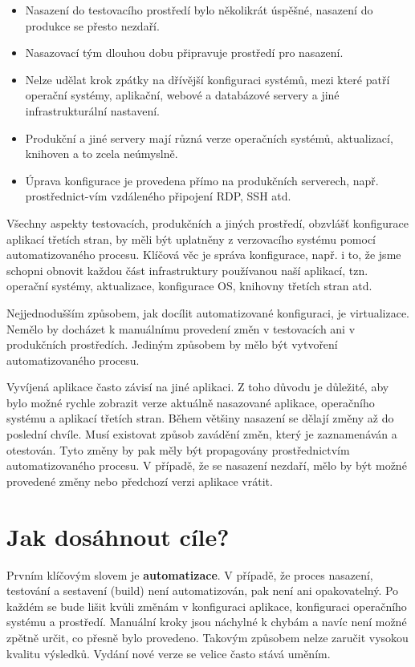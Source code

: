 \begin{itemize}
  \item Nasazení do testovacího prostředí bylo několikrát úspěšné, nasazení do produkce se přesto nezdaří.
  \item Nasazovací tým dlouhou dobu připravuje prostředí pro nasazení.
  \item Nelze udělat krok zpátky na dřívější konfiguraci systémů, mezi které patří operační systémy, aplikační, webové a databázové servery a jiné infrastrukturální nastavení.
  \item Produkční a jiné servery mají různá verze operačních systémů, aktualizací, knihoven a to zcela neúmyslně.
  \item Úprava konfigurace je provedena přímo na produkčních serverech, např. prostřednict-vím vzdáleného připojení RDP, SSH atd.
\end{itemize}

Všechny aspekty testovacích, produkčních a jiných prostředí, obzvlášť konfigurace aplikací třetích stran, by měli být uplatněny z verzovacího systému pomocí automatizovaného procesu. Klíčová věc je správa konfigurace, např. i to, že jsme schopni obnovit každou část infrastruktury používanou naší aplikací, tzn. operační systémy, aktualizace, konfigurace OS, knihovny třetích stran atd. 

Nejjednodušším způsobem, jak docílit automatizované konfiguraci, je virtualizace. Nemělo by docházet k manuálnímu provedení změn v testovacích ani v produkčních prostředích. Jediným způsobem by mělo být vytvoření automatizovaného procesu.

Vyvíjená aplikace často závisí na jiné aplikaci. Z toho důvodu je důležité, aby bylo možné rychle zobrazit verze aktuálně nasazované aplikace, operačního systému a aplikací třetích stran. Během většiny nasazení se dělají změny až do poslední chvíle. Musí existovat způsob zavádění změn, který je zaznamenáván a otestován. Tyto změny by pak měly být propagovány prostřednictvím automatizovaného procesu. V případě, že se nasazení nezdaří, mělo by být možné provedené změny nebo předchozí verzi aplikace vrátit.

\section{Jak dosáhnout cíle?}
Prvním klíčovým slovem je \textbf{automatizace}. V případě, že proces nasazení, testování a sestavení (build) není automatizován, pak není ani opakovatelný. Po každém se bude lišit kvůli změnám v konfiguraci aplikace, konfiguraci operačního systému a prostředí. 
Manuální kroky jsou náchylné k chybám a navíc není možné zpětně určit, co přesně bylo provedeno. Takovým způsobem nelze zaručit vysokou kvalitu výsledků. Vydání nové verze se velice často stává uměním. 

